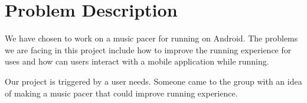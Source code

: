 \section{Problem Description}
We have chosen to work on a music pacer for running on Android. The problems we are facing in this project include how to improve the running experience for uses and how can users interact with a mobile application while running.

Our project is triggered by a user needs. Someone came to the group with an idea of making a music pacer that could improve running experience.


